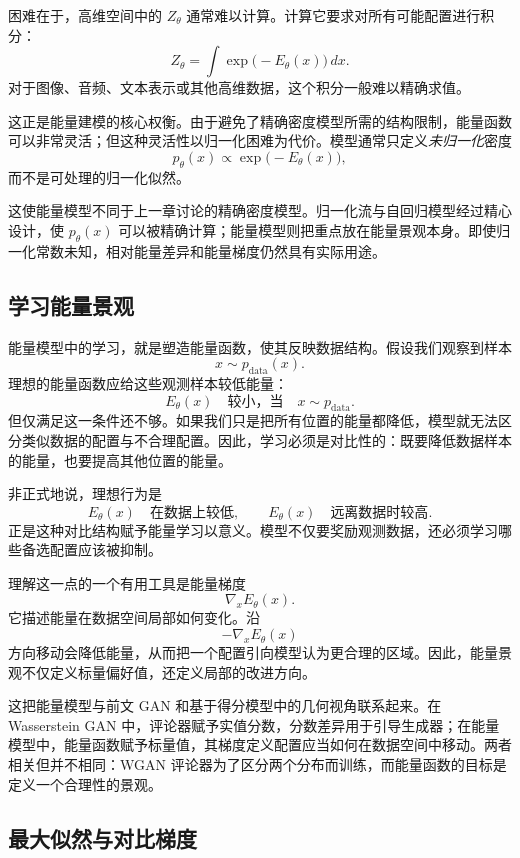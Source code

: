 

困难在于，高维空间中的 $Z_\theta$ 通常难以计算。计算它要求对所有可能配置进行积分：
\[
Z_\theta
=
\int
\exp\big(-E_\theta(x)\big)\,dx.
\]
对于图像、音频、文本表示或其他高维数据，这个积分一般难以精确求值。

这正是能量建模的核心权衡。由于避免了精确密度模型所需的结构限制，能量函数可以非常灵活；但这种灵活性以归一化困难为代价。模型通常只定义\emph{未归一化}密度
\[
p_\theta(x)
\propto
\exp\big(-E_\theta(x)\big),
\]
而不是可处理的归一化似然。

这使能量模型不同于上一章讨论的精确密度模型。归一化流与自回归模型经过精心设计，使 $p_\theta(x)$ 可以被精确计算；能量模型则把重点放在能量景观本身。即使归一化常数未知，相对能量差异和能量梯度仍然具有实际用途。

\subsection{学习能量景观}

能量模型中的学习，就是塑造能量函数，使其反映数据结构。假设我们观察到样本
\[
x\sim p_{\text{data}}(x).
\]
理想的能量函数应给这些观测样本较低能量：
\[
E_\theta(x)
\quad\text{较小，当}\quad
x\sim p_{\text{data}}.
\]
但仅满足这一条件还不够。如果我们只是把所有位置的能量都降低，模型就无法区分类似数据的配置与不合理配置。因此，学习必须是对比性的：既要降低数据样本的能量，也要提高其他位置的能量。

非正式地说，理想行为是
\[
E_\theta(x)
\quad\text{在数据上较低},
\qquad
E_\theta(x)
\quad\text{远离数据时较高}.
\]
正是这种对比结构赋予能量学习以意义。模型不仅要奖励观测数据，还必须学习哪些备选配置应该被抑制。

理解这一点的一个有用工具是能量梯度
\[
\nabla_x E_\theta(x).
\]
它描述能量在数据空间局部如何变化。沿
\[
-\nabla_x E_\theta(x)
\]
方向移动会降低能量，从而把一个配置引向模型认为更合理的区域。因此，能量景观不仅定义标量偏好值，还定义局部的改进方向。

这把能量模型与前文 GAN 和基于得分模型中的几何视角联系起来。在 Wasserstein GAN 中，评论器赋予实值分数，分数差异用于引导生成器；在能量模型中，能量函数赋予标量值，其梯度定义配置应当如何在数据空间中移动。两者相关但并不相同：WGAN 评论器为了区分两个分布而训练，而能量函数的目标是定义一个合理性的景观。

\subsection{最大似然与对比梯度}

